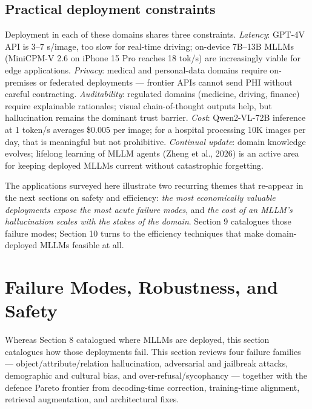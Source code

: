 \documentclass{article}
\begin{document}
\subsection{Practical deployment constraints}\label{practical-deployment-constraints}

Deployment in each of these domains shares three constraints. \emph{Latency}: GPT-4V API is 3--7 s/image, too slow for real-time driving; on-device 7B--13B MLLMs (MiniCPM-V 2.6 on iPhone 15 Pro reaches 18 tok/s) are increasingly viable for edge applications. \emph{Privacy}: medical and personal-data domains require on-premises or federated deployments --- frontier APIs cannot send PHI without careful contracting. \emph{Auditability}: regulated domains (medicine, driving, finance) require explainable rationales; visual chain-of-thought outputs help, but hallucination remains the dominant trust barrier. \emph{Cost}: Qwen2-VL-72B inference at 1 token/s averages \$0.005 per image; for a hospital processing 10K images per day, that is meaningful but not prohibitive. \emph{Continual update}: domain knowledge evolves; lifelong learning of MLLM agents (Zheng et al., 2026) is an active area for keeping deployed MLLMs current without catastrophic forgetting.

The applications surveyed here illustrate two recurring themes that re-appear in the next sections on safety and efficiency: \emph{the most economically valuable deployments expose the most acute failure modes}, and \emph{the cost of an MLLM's hallucination scales with the stakes of the domain}. Section 9 catalogues those failure modes; Section 10 turns to the efficiency techniques that make domain-deployed MLLMs feasible at all.

\section{Failure Modes, Robustness, and Safety}\label{failure-modes-robustness-and-safety}

Whereas Section 8 catalogued where MLLMs are deployed, this section catalogues how those deployments fail. This section reviews four failure families --- object/attribute/relation hallucination, adversarial and jailbreak attacks, demographic and cultural bias, and over-refusal/sycophancy --- together with the defence Pareto frontier from decoding-time correction, training-time alignment, retrieval augmentation, and architectural fixes.
\end{document}
